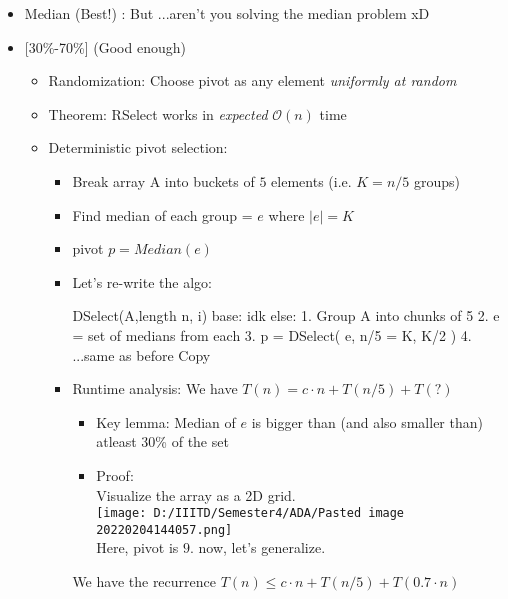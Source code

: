 \documentclass[a4paper
]{article}
\newenvironment{Shaded}{}{}
\newcommand{\NormalTok}[1]{#1}
\providecommand{\tightlist}{%
  \setlength{\itemsep}{0pt}\setlength{\parskip}{0pt}}
\begin{document}
\begin{itemize}
\tightlist
\item
  Median (Best!) : But ...aren't you solving the median problem xD
\item
  {[}30\%-70\%{]} (Good enough)

  \begin{itemize}
  \tightlist
  \item
    Randomization: Choose pivot as any element \emph{uniformly at
    random}
  \item
    Theorem: RSelect works in \emph{expected} {\(\mathcal{O}(n)\)} time
  \item
    Deterministic pivot selection:

    \begin{itemize}
    \item
      Break array A into buckets of {\(5\)} elements (i.e. {\(K = n/5\)}
      groups)
    \item
      Find median of each group = {\(e\)} where {\(|e| = K\)}
    \item
      pivot {\(p = {Median}(e)\)}
    \item
      Let's re-write the algo:

\begin{Shaded}
\begin{Highlighting}[]
\NormalTok{DSelect(A,length n, i)}
\NormalTok{    base: idk}
\NormalTok{    else:}
\NormalTok{        1. Group A into chunks of 5}
\NormalTok{        2. e = set of medians from each}
\NormalTok{        3. p = DSelect( e, n/5 = K, K/2 )}
\NormalTok{        4. ...same as before}
\NormalTok{Copy}
\end{Highlighting}
\end{Shaded}
    \item
      Runtime analysis: We have {\(T(n) = c \cdot n + T(n/5) + T(?)\)}

      \begin{itemize}
      \tightlist
      \item
        Key lemma: Median of {\(e\)} is bigger than (and also smaller
        than) atleast 30\% of the set
      \item
        Proof:\\
        Visualize the array as a 2D grid.\\
        \texttt{[image: D:/IIITD/Semester4/ADA/Pasted image 20220204144057.png]}\\
        Here, pivot is {\(9\)}. now, let's generalize.
      \end{itemize}

      We have the recurrence
      {\(T(n) \leq c \cdot n + T(n/5) + T(0.7 \cdot n)\)}
    \end{itemize}
  \end{itemize}
\end{itemize}
\end{document}
